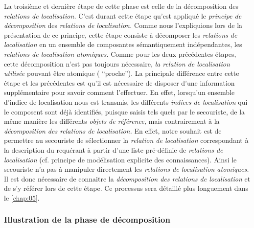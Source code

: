 La troisième et dernière étape de cette phase est celle de la
décomposition des \emph{relations de localisation.} C'est durant cette
étape qu'est appliqué le \emph{principe de décomposition} des
\emph{relations de localisation.} Comme nous l'expliquions lors de la
présentation de ce principe, cette étape consiste à décomposer les
\emph{relations de localisation} en un ensemble de composantes
sémantiquement indépendantes, les \emph{relations de localisation
  atomiques.} Comme pour les deux précédentes étapes, cette
décomposition n'est pas toujours nécessaire, \emph{la relation de
  localisation utilisée} pouvant être atomique (\eg
\enquote{proche}). La principale différence entre cette étape et les
précédentes est qu'il est nécessaire de disposer d'une information
supplémentaire pour savoir comment l'effectuer. En effet, lorsqu'un
ensemble d'indice de localisation nous est transmis, les différents
\emph{indices de localisation} qui le composent sont déjà identifiés,
puisque saisis tels quels par le secouriste, de la même manière les
différents \emph{objets de référence,} mais contrairement à la
\emph{décomposition des relations de localisation.} En effet, notre
souhait est de permettre au secouriste de sélectionner la
\emph{relation de localisation} correspondant à la description du
requérant à partir d'une liste pré-définie de \emph{relations de
  localisation} (cf. principe de modélisation explicite des
connaissances). Ainsi le secouriste n'a pas à manipuler directement
les \emph{relations de localisation atomiques.} Il est donc nécessaire
de connaitre la \emph{décomposition des relations de localisation} et
de s'y référer lors de cette étape. Ce processus sera détaillé plus
longuement dans le \autoref{chap:05}.

\subsubsection{Illustration de la phase de décomposition}

